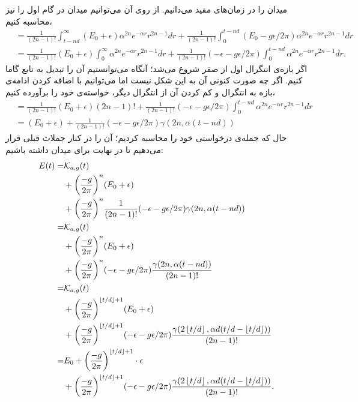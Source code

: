 میدان را در زمان‌های مقید می‌دانیم. از روی آن می‌توانیم میدان در گام اول را نیز محاسبه کنیم،
\begin{align}
	&= \frac{1}{(2n-1)!} \int_{t-nd}^{\infty} (E_0 + \epsilon) \alpha^{2n} e^{-\alpha r} r^{2n-1} dr + \frac{1}{(2n-1)!} \int_{0}^{t - nd}(E_0 - g\epsilon/2\pi) \alpha^{2n} e^{-\alpha r} r^{2n-1} dr\\
	&= \frac{1}{(2n-1)!} (E_0 + \epsilon) \int_{0}^{\infty} \alpha^{2n} e^{-\alpha r} r^{2n-1} dr + \frac{1}{(2n-1)!} ( - \epsilon - g\epsilon/2\pi) \int_{0}^{t - nd} \alpha^{2n} e^{-\alpha r} r^{2n-1} dr .
\end{align}
اگر بازه‌ی انتگرال اول از صفر شروع می‌شد؛ آنگاه می‌توانستیم آن را تبدیل به تابع گاما کنیم. اگر چه صورت کنونی آن به این شکل نیست اما می‌توانیم با اضافه کردن ادامه‌ی بازه به انتگرال و کم کردن آن از انتگرال دیگر، خواسته‌ی خود را برآورده کنیم،
\begin{align}
	&= \frac{1}{(2n-1)!} (E_0 + \epsilon) (2n - 1)! + \frac{1}{(2n-1)!} ( - \epsilon - g\epsilon/2\pi) \int_{0}^{t - nd} \alpha^{2n} e^{-\alpha r} r^{2n-1} dr\\
	&= (E_0 + \epsilon) + \frac{1}{(2n-1)!} ( - \epsilon - g\epsilon/2\pi) \gamma(2n,\alpha( t-nd))
\end{align}
حال که جمله‌ی درخواستی خود را محاسبه کردیم؛ آن را در کنار جملات قبلی قرار می‌دهیم تا در نهایت برای میدان داشته باشیم:
\begin{align}
	E(t) =& \mathcal{K}_{a,g}(t) \\
	&+ \bigg(\frac{-g}{2\pi}\bigg)^n (E_0 + \epsilon) \\
	&+ \bigg(\frac{-g}{2\pi}\bigg)^n \frac{1}{(2n-1)!} ( - \epsilon - g\epsilon/2\pi) \gamma(2n,\alpha( t-nd))\\
	=& \mathcal{K}_{a,g}(t) \\
	&+ \bigg(\frac{-g}{2\pi}\bigg)^n (E_0 + \epsilon)\\
	&+ \bigg(\frac{-g}{2\pi}\bigg)^n ( - \epsilon - g\epsilon/2\pi) \frac{\gamma(2n,\alpha( t-nd))}{(2n-1)!}\\
	=& \mathcal{K}_{a,g}(t) \\
	&+ \bigg(\frac{-g}{2\pi}\bigg)^{\left\lfloor t/d \right\rfloor+1} (E_0 + \epsilon)\\
	&+ \bigg(\frac{-g}{2\pi}\bigg)^{\left\lfloor t/d \right\rfloor + 1} ( - \epsilon - g\epsilon/2\pi) \frac{\gamma(2\left\lfloor t/d \right\rfloor,\alpha d( t/d - \left\lfloor t/d \right\rfloor))}{(2n-1)!}\\
	=& E_0 + \bigg(\frac{-g}{2\pi}\bigg)^{\left\lfloor t/d \right\rfloor+1} \cdot \epsilon\\
	&+ \bigg(\frac{-g}{2\pi}\bigg)^{\left\lfloor t/d \right\rfloor+1} ( - \epsilon - g\epsilon/2\pi) \frac{\gamma(2\left\lfloor t/d \right\rfloor,\alpha d( t/d - \left\lfloor t/d \right\rfloor))}{(2n-1)!} . \\
\end{align}
